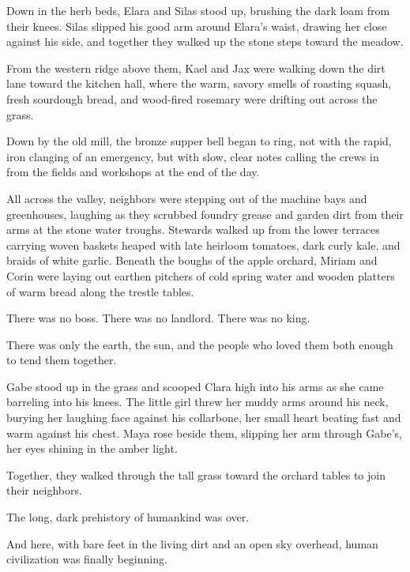 Down in the herb beds, Elara and Silas stood up, brushing the dark loam from their knees. Silas slipped his good arm around Elara’s waist, drawing her close against his side, and together they walked up the stone steps toward the meadow.

From the western ridge above them, Kael and Jax were walking down the dirt lane toward the kitchen hall, where the warm, savory smells of roasting squash, fresh sourdough bread, and wood-fired rosemary were drifting out across the grass.

Down by the old mill, the bronze supper bell began to ring, not with the rapid, iron clanging of an emergency, but with slow, clear notes calling the crews in from the fields and workshops at the end of the day.

All across the valley, neighbors were stepping out of the machine bays and greenhouses, laughing as they scrubbed foundry grease and garden dirt from their arms at the stone water troughs. Stewards walked up from the lower terraces carrying woven baskets heaped with late heirloom tomatoes, dark curly kale, and braids of white garlic. Beneath the boughs of the apple orchard, Miriam and Corin were laying out earthen pitchers of cold spring water and wooden platters of warm bread along the trestle tables.

There was no boss. There was no landlord. There was no king.

There was only the earth, the sun, and the people who loved them both enough to tend them together.

Gabe stood up in the grass and scooped Clara high into his arms as she came barreling into his knees. The little girl threw her muddy arms around his neck, burying her laughing face against his collarbone, her small heart beating fast and warm against his chest. Maya rose beside them, slipping her arm through Gabe's, her eyes shining in the amber light.

Together, they walked through the tall grass toward the orchard tables to join their neighbors.

The long, dark prehistory of humankind was over.

And here, with bare feet in the living dirt and an open sky overhead, human civilization was finally beginning.
